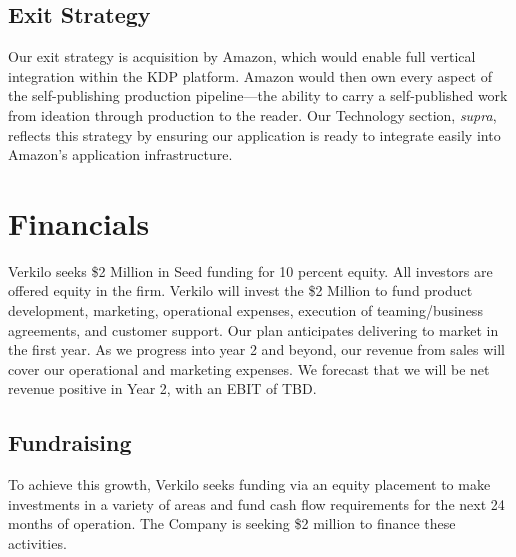 \documentclass[10pt,openany]{book}
\begin{document}
\hypertarget{exit-strategy}{%
\section{Exit Strategy}\label{exit-strategy}}

Our exit strategy is acquisition by Amazon, which would enable full
vertical integration within the KDP platform. Amazon would then own
every aspect of the self-publishing production pipeline---the ability to
carry a self-published work from ideation through production to the
reader. Our Technology section, \emph{supra}, reflects this strategy by
ensuring our application is ready to integrate easily into Amazon's
application infrastructure.

\hypertarget{financials}{%
\chapter{Financials}\label{financials}}

Verkilo seeks \$2 Million in Seed funding for 10 percent equity. All
investors are offered equity in the firm. Verkilo will invest the \$2
Million to fund product development, marketing, operational expenses,
execution of teaming/business agreements, and customer support. Our plan
anticipates delivering to market in the first year. As we progress into
year 2 and beyond, our revenue from sales will cover our operational and
marketing expenses. We forecast that we will be net revenue positive in
Year 2, with an EBIT of TBD.

\hypertarget{fundraising}{%
\section{Fundraising}\label{fundraising}}

To achieve this growth, Verkilo seeks funding via an equity placement to
make investments in a variety of areas and fund cash flow requirements
for the next 24 months of operation. The Company is seeking \$2 million
to finance these activities.
\end{document}
